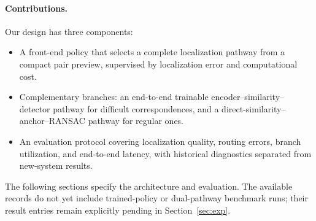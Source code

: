 \paragraph{Contributions.}
Our design has three components:
\begin{itemize}
\item A front-end policy that selects a complete localization pathway from a compact pair
preview, supervised by localization error and computational cost.
\item Complementary branches: an end-to-end trainable encoder--similarity--detector pathway
for difficult correspondences, and a direct-similarity--anchor--RANSAC pathway for regular ones.
\item An evaluation protocol covering localization quality, routing errors, branch utilization,
and end-to-end latency, with historical diagnostics separated from new-system results.
\end{itemize}
The following sections specify the architecture and evaluation. The available records do
not yet include trained-policy or dual-pathway benchmark runs; their result entries remain
explicitly pending in Section~\ref{sec:exp}.
